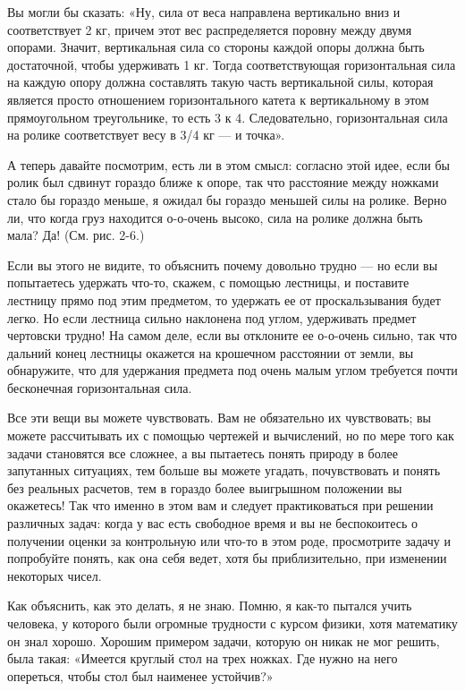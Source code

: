 \documentclass[10pt,oneside]{article}
\newcommand{\TipsRunning}[1]{\par\vspace{2bp}{\centering\footnotesize #1\par}\vspace{2bp}}
\begin{document}
Вы могли бы сказать: «Ну, сила от веса направлена вертикально вниз и соответствует 2 кг, причем этот вес распределяется поровну между двумя опорами. Значит, вертикальная сила со стороны каждой опоры должна быть достаточной, чтобы удерживать 1 кг. Тогда соответствующая горизонтальная сила на каждую опору должна составлять такую часть вертикальной силы, которая является просто отношением горизонтального катета к вертикальному в этом прямоугольном треугольнике, то есть 3 к 4. Следовательно, горизонтальная сила на ролике соответствует весу в 3/4 кг --- и точка».\par

А теперь давайте посмотрим, есть ли в этом смысл: согласно этой идее, если бы ролик был сдвинут гораздо ближе к опоре, так что расстояние между ножками стало бы гораздо меньше, я ожидал бы гораздо меньшей силы на ролике. Верно ли, что когда груз находится о-о-очень высоко, сила на ролике должна быть мала? Да! (См. рис. 2-6.)\par

Если вы этого не видите, то объяснить почему довольно трудно --- но если вы попытаетесь удержать что-то, скажем, с помощью лестницы, и поставите лестницу прямо под этим предметом, то удержать ее от проскальзывания будет легко. Но если лестница сильно наклонена под углом, удерживать предмет чертовски трудно! На самом деле, если вы отклоните ее о-о-очень сильно, так что дальний конец лестницы окажется на крошечном расстоянии от земли, вы обнаружите, что для удержания предмета под очень малым углом требуется почти бесконечная горизонтальная сила.\par

Все эти вещи вы можете чувствовать. Вам не обязательно их чувствовать; вы можете рассчитывать их с помощью чертежей и вычислений, но по мере того как задачи становятся все сложнее, а вы пытаетесь понять природу в более запутанных ситуациях, тем больше вы можете угадать, почувствовать и понять без реальных расчетов, тем в гораздо более выигрышном положении вы окажетесь! Так что именно в этом вам и следует практиковаться при решении различных задач: когда у вас есть свободное время и вы не беспокоитесь о получении оценки за контрольную или что-то в этом роде, просмотрите задачу и попробуйте понять, как она себя ведет, хотя бы приблизительно, при изменении некоторых чисел.\par

\TipsRunning{З А К О Н Ы  И  И Н Т У И Ц И Я • 7 3}

Как объяснить, как это делать, я не знаю. Помню, я как-то пытался учить человека, у которого были огромные трудности с курсом физики, хотя математику он знал хорошо. Хорошим примером задачи, которую он никак не мог решить, была такая: «Имеется круглый стол на трех ножках. Где нужно на него опереться, чтобы стол был наименее устойчив?»\par
\end{document}
